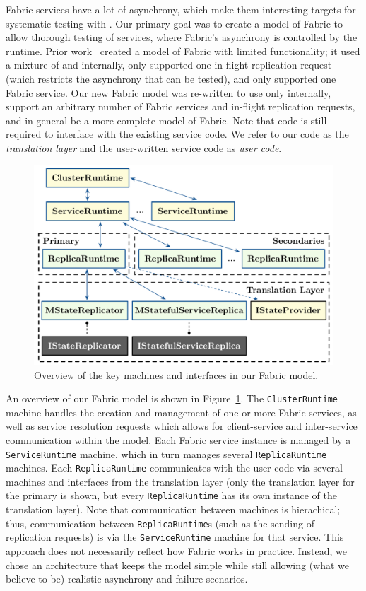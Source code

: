 Fabric services have a lot of asynchrony, which make them interesting targets for systematic testing with \psharp{}.
Our primary goal was to create a \psharp{} model of Fabric to allow
thorough testing of services, where Fabric's asynchrony is controlled 
by the \psharp{} runtime.
Prior work~\cite{deligiannis2015psharp}
created a model of Fabric with limited functionality;
it used a mixture of \csharp{} and \psharp{} internally,
only supported one in-flight replication request
(which restricts the asynchrony that can be tested),
and only supported one Fabric service.
Our new Fabric model was re-written to use only \psharp{}
internally,
support an arbitrary number of Fabric services and in-flight replication requests,
and in general be a more complete model of Fabric.
Note that \csharp{} code is still required to interface with the existing
\csharp{} service code.
We refer to our \csharp{} code
as the \emph{translation layer}
and
 the user-written \csharp{} service code as \emph{user code}. 

\begin{figure}[thb]
\centering
\includegraphics[width=\linewidth]{img/fabricmodel}
\caption{Overview of the key machines and interfaces in our Fabric model.}
\label{fig:fabric_model}
\end{figure}

An overview of our Fabric model is shown in Figure~\ref{fig:fabric_model}.
The \texttt{ClusterRuntime} machine 
handles the creation and management of 
one or more Fabric services,
as well as service resolution requests
which allows for client-service and inter-service communication
within the model.
Each Fabric service instance is managed by a \texttt{ServiceRuntime}
machine, which in turn manages 
several \texttt{ReplicaRuntime} machines.
Each \texttt{ReplicaRuntime} communicates with the user code
via several machines and interfaces from the translation layer
(only the translation layer for the primary is shown,
but every \texttt{ReplicaRuntime} has its own instance of the translation layer).
Note that communication between machines is hierachical;
thus, communication between \texttt{ReplicaRuntime}s
(such as the sending of replication requests)
is via the \texttt{ServiceRuntime} machine for that service.
This approach does not necessarily reflect how Fabric works in practice.
Instead, we chose an architecture
that keeps the model simple
while still allowing (what we believe to be) realistic
asynchrony and failure scenarios.

